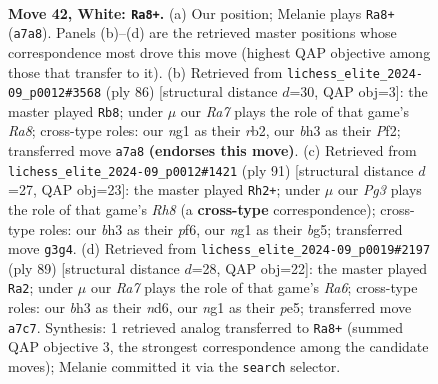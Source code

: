 \documentclass[11pt]{article}
\begin{document}
\clearpage

\begin{figure}[p]\centering
\begin{subfigure}{0.46\textwidth}\centering
\resizebox{\linewidth}{!}{%
\newchessgame
\chessboard[
  setfen={7k/R4p1p/3r2p1/8/1p2P3/6Pb/7P/4K1nr w - - 0 42},
  showmover=false,
  pgfstyle=straightmove, color=movearrow, markmove={a7-a8}
]}
\caption{}
\end{subfigure}\hfill
\begin{subfigure}{0.46\textwidth}\centering
\resizebox{\linewidth}{!}{%
\newchessgame
\chessboard[
  setfen={R7/1b5p/8/3p3N/1kp1p2P/4P3/1r3P2/6K1 w - - 8 44},
  showmover=false,
  pgfstyle=straightmove, color=movearrow, markmove={a8-b8}
]}
\caption{}
\end{subfigure}
\\[4pt]
\begin{subfigure}{0.46\textwidth}\centering
\resizebox{\linewidth}{!}{%
\newchessgame
\chessboard[
  setfen={8/5k2/5P2/p2ppRB1/1p6/8/PPK5/7r b - - 7 46},
  showmover=false,
  pgfstyle=straightmove, color=movearrow, markmove={h1-h2}
]}
\caption{}
\end{subfigure}\hfill
\begin{subfigure}{0.46\textwidth}\centering
\resizebox{\linewidth}{!}{%
\newchessgame
\chessboard[
  setfen={3k4/5Rpp/3Np3/4P3/3K1P2/r5P1/7P/8 b - - 0 45},
  showmover=false,
  pgfstyle=straightmove, color=movearrow, markmove={a3-a2}
]}
\caption{}
\end{subfigure}
\caption{\textbf{Move 42, White: \texttt{Ra8+}.} (a) Our position; Melanie plays \texttt{Ra8+} (\texttt{a7a8}). Panels (b)--(d) are the retrieved master positions whose correspondence most drove this move (highest QAP objective among those that transfer to it). (b) Retrieved from \texttt{lichess\_elite\_2024-09\_p0012\#3568} (ply 86) [structural distance $d$=30, QAP obj=3]: the master played \texttt{Rb8}; under $\mu$ our \emph{Ra7} plays the role of that game's \emph{Ra8}; cross-type roles: our \emph{n}g1 as their \emph{r}b2, our \emph{b}h3 as their \emph{P}f2; transferred move \texttt{a7a8} \textbf{(endorses this move)}. (c) Retrieved from \texttt{lichess\_elite\_2024-09\_p0012\#1421} (ply 91) [structural distance $d$=27, QAP obj=23]: the master played \texttt{Rh2+}; under $\mu$ our \emph{Pg3} plays the role of that game's \emph{Rh8} (a \textbf{cross-type} correspondence); cross-type roles: our \emph{b}h3 as their \emph{p}f6, our \emph{n}g1 as their \emph{b}g5; transferred move \texttt{g3g4}. (d) Retrieved from \texttt{lichess\_elite\_2024-09\_p0019\#2197} (ply 89) [structural distance $d$=28, QAP obj=22]: the master played \texttt{Ra2}; under $\mu$ our \emph{Ra7} plays the role of that game's \emph{Ra6}; cross-type roles: our \emph{b}h3 as their \emph{n}d6, our \emph{n}g1 as their \emph{p}e5; transferred move \texttt{a7c7}. Synthesis: 1 retrieved analog transferred to \texttt{Ra8+} (summed QAP objective 3, the strongest correspondence among the candidate moves); Melanie committed it via the \texttt{search} selector.}
\label{fig:thought-m82}
\end{figure}
\end{document}
